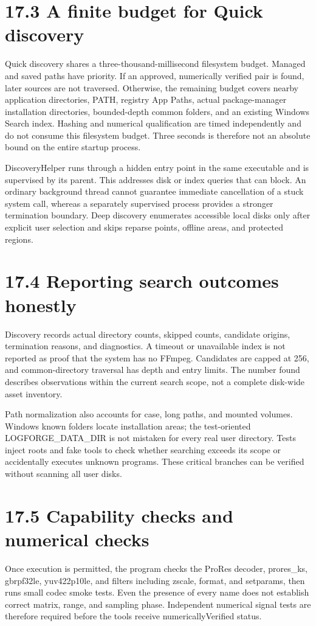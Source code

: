 \documentclass[11pt,a4paper,openany]{book}
\begin{document}
\section*{17.3 A finite budget for Quick discovery}
Quick discovery shares a three-thousand-millisecond filesystem budget. Managed and saved paths have priority. If an approved, numerically verified pair is found, later sources are not traversed. Otherwise, the remaining budget covers nearby application directories, PATH, registry App Paths, actual package-manager installation directories, bounded-depth common folders, and an existing Windows Search index. Hashing and numerical qualification are timed independently and do not consume this filesystem budget. Three seconds is therefore not an absolute bound on the entire startup process.

DiscoveryHelper runs through a hidden entry point in the same executable and is supervised by its parent. This addresses disk or index queries that can block. An ordinary background thread cannot guarantee immediate cancellation of a stuck system call, whereas a separately supervised process provides a stronger termination boundary. Deep discovery enumerates accessible local disks only after explicit user selection and skips reparse points, offline areas, and protected regions.


\section*{17.4 Reporting search outcomes honestly}
Discovery records actual directory counts, skipped counts, candidate origins, termination reasons, and diagnostics. A timeout or unavailable index is not reported as proof that the system has no FFmpeg. Candidates are capped at 256, and common-directory traversal has depth and entry limits. The number found describes observations within the current search scope, not a complete disk-wide asset inventory.

Path normalization also accounts for case, long paths, and mounted volumes. Windows known folders locate installation areas; the test-oriented LOGFORGE\_DATA\_DIR is not mistaken for every real user directory. Tests inject roots and fake tools to check whether searching exceeds its scope or accidentally executes unknown programs. These critical branches can be verified without scanning all user disks.


\section*{17.5 Capability checks and numerical checks}
Once execution is permitted, the program checks the ProRes decoder, prores\_ks, gbrpf32le, yuv422p10le, and filters including zscale, format, and setparams, then runs small codec smoke tests. Even the presence of every name does not establish correct matrix, range, and sampling phase. Independent numerical signal tests are therefore required before the tools receive numericallyVerified status.
\end{document}
